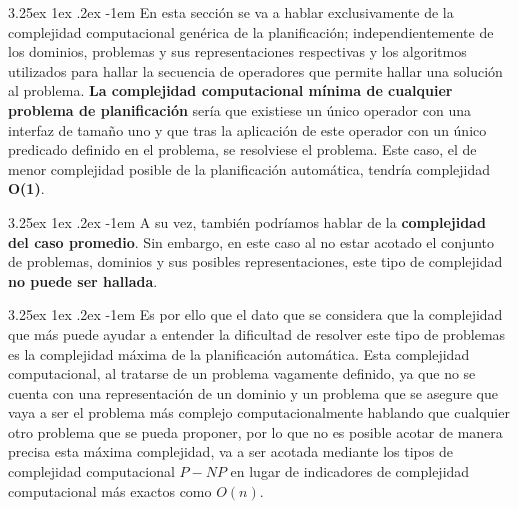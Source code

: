 \documentclass{article}
\makeatletter
\renewcommand\paragraph{\@startsection{paragraph}{5}{\z@}%
      {3.25ex \@plus1ex \@minus.2ex}%
      {-1em}%
      {\normalfont\normalsize\bfseries}}
\makeatother
\begin{document}
    \paragraph{}
    En esta sección se va a hablar exclusivamente de la complejidad computacional genérica de la planificación; independientemente de los dominios, problemas y sus representaciones respectivas y los algoritmos utilizados para hallar la secuencia de operadores que permite hallar una solución al problema. \textbf{La complejidad computacional mínima de cualquier problema de planificación} sería que existiese un único operador con una interfaz de tamaño uno y que tras la aplicación de este operador con un único predicado definido en el problema, se resolviese el problema. Este caso, el de menor complejidad posible de la planificación automática, tendría complejidad \textbf{O(1)}.
    
    \paragraph{}
    A su vez, también podríamos hablar de la \textbf{complejidad del caso promedio}. Sin embargo, en este caso al no estar acotado el conjunto de problemas, dominios y sus posibles representaciones, este tipo de complejidad \textbf{no puede ser hallada}.
    
    \paragraph{}
    Es por ello que el dato que se considera que la complejidad que más puede ayudar a entender la dificultad de resolver este tipo de problemas es la complejidad máxima de la planificación automática. Esta complejidad computacional, al tratarse de un problema vagamente definido, ya que no se cuenta con una representación de un dominio y un problema que se asegure que vaya a ser el problema más complejo computacionalmente hablando que cualquier otro problema que se pueda proponer, por lo que no es posible acotar de manera precisa esta máxima complejidad, va a ser acotada mediante los tipos de complejidad computacional $P-NP$ en lugar de indicadores de complejidad computacional más exactos como $O(n)$.
    
\end{document}
